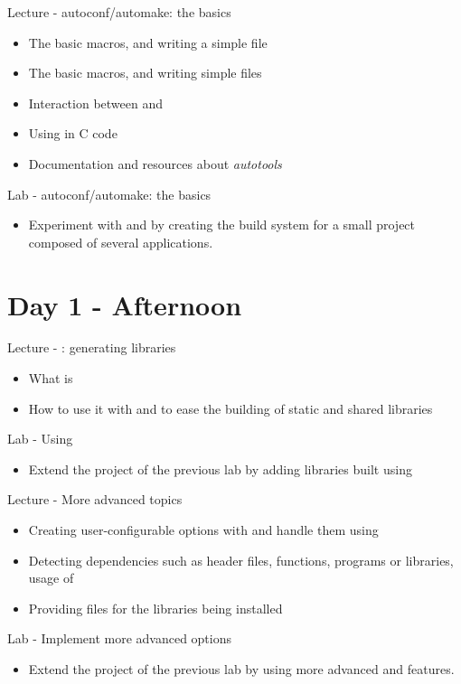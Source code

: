 \documentclass[a4paper,12pt,obeyspaces,spaces,hyphens]{article}
\begin{document}
\feagendatwocolumn
{Lecture - autoconf/automake: the basics}
{
  \begin{itemize}
  \item The basic  macros, and writing a simple
     file
  \item The basic  macros, and writing simple
     files
  \item Interaction between  and 
  \item Using  in C code
  \item Documentation and resources about {\em autotools}
  \end{itemize}
}
{Lab - autoconf/automake: the basics}
{
  \begin{itemize}
  \item Experiment with  and  by creating
    the build system for a small project composed of several applications.
  \end{itemize}
}

\section{Day 1 - Afternoon}

\feagendatwocolumn
{Lecture - : generating libraries}
{
  \begin{itemize}
  \item What  is
  \item How to use it with  and  to ease
    the building of static and shared libraries
  \end{itemize}
}
{Lab - Using }
{
  \begin{itemize}
  \item Extend the project of the previous lab by adding libraries
    built using 
  \end{itemize}
}

\feagendatwocolumn
{Lecture - More advanced topics}
{
  \begin{itemize}
  \item Creating user-configurable options with  and
    handle them using 
  \item Detecting dependencies such as header files, functions,
    programs or libraries, usage of 
  \item Providing  files for the libraries being
    installed
  \end{itemize}
}
{Lab - Implement more advanced options}
{
  \begin{itemize}
  \item Extend the project of the previous lab by using more advanced
     and  features.
  \end{itemize}
}
\end{document}
